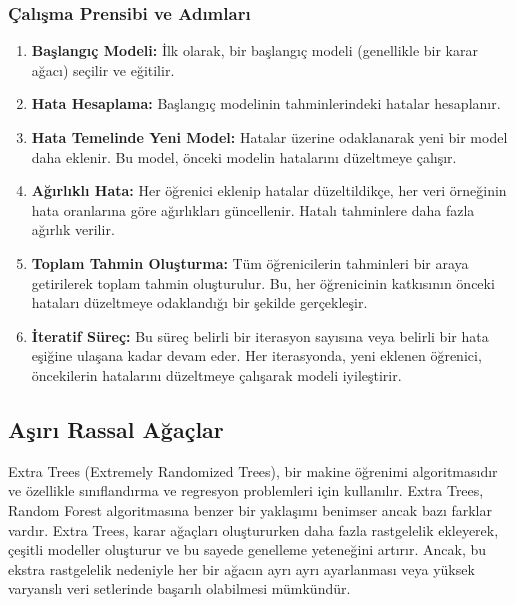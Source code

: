 \subsubsection{Çalışma Prensibi ve Adımları}
\begin{enumerate}
\item \textbf{Başlangıç Modeli:} İlk olarak, bir başlangıç modeli (genellikle bir karar ağacı) seçilir ve eğitilir.
\item \textbf{Hata Hesaplama:} Başlangıç modelinin tahminlerindeki hatalar hesaplanır.
\item \textbf{Hata Temelinde Yeni Model:} Hatalar üzerine odaklanarak yeni bir model daha eklenir. Bu model, önceki modelin hatalarını düzeltmeye çalışır.
\item \textbf{Ağırlıklı Hata:} Her öğrenici eklenip hatalar düzeltildikçe, her veri örneğinin hata oranlarına göre ağırlıkları güncellenir. Hatalı tahminlere daha fazla ağırlık verilir.
\item \textbf{Toplam Tahmin Oluşturma:} Tüm öğrenicilerin tahminleri bir araya getirilerek toplam tahmin oluşturulur. Bu, her öğrenicinin katkısının önceki hataları düzeltmeye odaklandığı bir şekilde gerçekleşir.
\item \textbf{İteratif Süreç:} Bu süreç belirli bir iterasyon sayısına veya belirli bir hata eşiğine ulaşana kadar devam eder. Her iterasyonda, yeni eklenen öğrenici, öncekilerin hatalarını düzeltmeye çalışarak modeli iyileştirir.
\end{enumerate}

\subsection{Aşırı Rassal Ağaçlar}
Extra Trees (Extremely Randomized Trees), bir makine öğrenimi algoritmasıdır ve özellikle sınıflandırma ve regresyon problemleri için kullanılır. Extra Trees, Random Forest algoritmasına benzer bir yaklaşımı benimser ancak bazı farklar vardır. Extra Trees, karar ağaçları oluştururken daha fazla rastgelelik ekleyerek, çeşitli modeller oluşturur ve bu sayede genelleme yeteneğini artırır. Ancak, bu ekstra rastgelelik nedeniyle her bir ağacın ayrı ayrı ayarlanması veya yüksek varyanslı veri setlerinde başarılı olabilmesi mümkündür.

